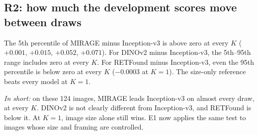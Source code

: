\documentclass[10pt,a4paper]{article}
\newenvironment{parts}{\begin{description}[style=unboxed, leftmargin=0pt, itemsep=3pt, font=\normalfont\bfseries\itshape]}{\end{description}}
\newenvironment{topic}[2]{\subsection{#1}\label{#2}\begin{parts}}{\end{parts}}
\begin{document}
\begin{topic}{R2: how much the development scores move between draws}{sec:r2}
\smallskip
{}

\smallskip
\noindent
The 5th percentile of MIRAGE minus Inception-v3 is above zero at every $K$ ($+0.001$, $+0.015$, $+0.052$,
$+0.071$). For DINOv2 minus Inception-v3, the 5th--95th range includes zero at every $K$. For RETFound minus
Inception-v3, even the 95th percentile is below zero at every $K$ ($-0.0003$ at $K=1$). The size-only reference
beats every model at $K=1$.

\noindent
\emph{In short:} on these 124 images, MIRAGE leads Inception-v3 on almost every draw, at every $K$. DINOv2 is
not clearly different from Inception-v3, and RETFound is below it. At $K=1$, image size alone still wins. E1 now
applies the same test to images whose size and framing are controlled.
\end{topic}
\end{document}
